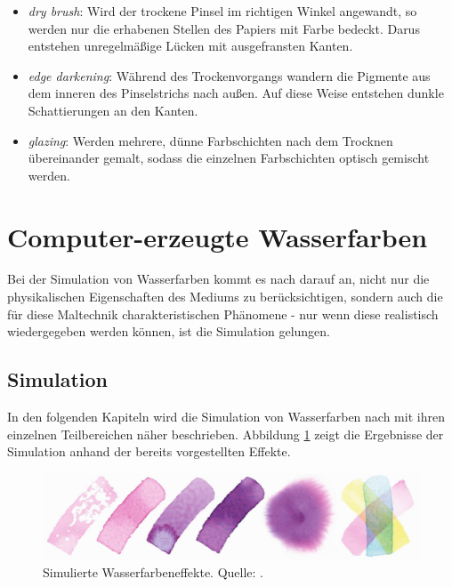 \begin{itemize}
  \item \textsl{dry brush}: Wird der trockene Pinsel im richtigen Winkel
  angewandt, so werden nur die erhabenen Stellen des Papiers mit Farbe bedeckt.
  Darus entstehen unregelmäßige Lücken mit ausgefransten Kanten.
  \item \textsl{edge darkening}: Während des Trockenvorgangs wandern die 
  Pigmente aus dem inneren des Pinselstrichs nach außen. Auf diese Weise 
  entstehen dunkle Schattierungen an den Kanten.
  \item \textsl{glazing}: Werden mehrere, dünne Farbschichten nach dem Trocknen
  übereinander gemalt, sodass die einzelnen Farbschichten optisch gemischt werden.
\end{itemize}

\section{Computer-erzeugte Wasserfarben}
Bei der Simulation von Wasserfarben kommt es nach \cite{Curtis1997} darauf an, 
nicht nur die physikalischen Eigenschaften des Mediums zu berücksichtigen, 
sondern auch die für diese Maltechnik charakteristischen Phänomene - nur wenn 
diese realistisch wiedergegeben werden können, ist die Simulation gelungen.

\subsection{Simulation}
In den folgenden Kapiteln wird die Simulation von Wasserfarben nach
\cite{Curtis1997} mit ihren einzelnen Teilbereichen näher beschrieben. Abbildung
\ref{fig:effects-simulated} zeigt die Ergebnisse der Simulation anhand der
bereits vorgestellten Effekte.

\begin{figure}
  \centering
  \includegraphics[width=1.00\textwidth]{../images/Curtis1997-simulated-watercolor-effects.eps}
  \caption{Simulierte Wasserfarbeneffekte. Quelle: \cite{Curtis1997}.}
  \label{fig:effects-simulated}
\end{figure}

